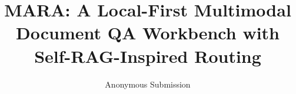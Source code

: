 \documentclass[11pt]{article}
\title{MARA: A Local-First Multimodal Document QA Workbench with Self-RAG-Inspired Routing}
\author{Anonymous Submission}
\begin{document}
\maketitle



\raggedbottom


\appendix

\end{document}
